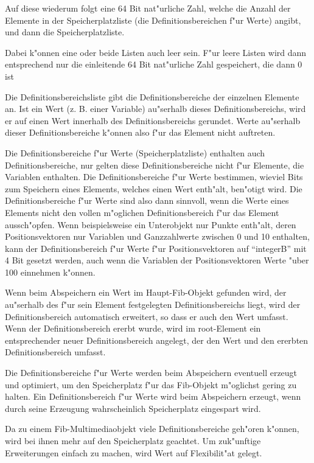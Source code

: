 Auf diese wiederum folgt eine 64 Bit nat"urliche Zahl, welche die Anzahl der Elemente in der Speicherplatzliste (die Definitionsbereichen f"ur Werte) angibt, und dann die Speicherplatzliste.

Dabei k"onnen eine oder beide Listen auch leer sein. F"ur leere Listen wird dann entsprechend nur die einleitende 64 Bit nat"urliche Zahl gespeichert, die dann 0 ist

Die Definitionsbereichsliste gibt die Definitionsbereiche der einzelnen Elemente an. Ist ein Wert (z. B. einer Variable) au"serhalb dieses Definitionsbereichs, wird er auf einen Wert innerhalb des Definitionsbereichs gerundet. Werte au"serhalb dieser Definitionsbereiche k"onnen also f"ur das Element nicht auftreten.

Die Definitionsbereiche f"ur Werte (Speicherplatzliste) enthalten auch Definitionsbereiche, nur gelten diese Definitionsbereiche nicht f"ur Elemente, die Variablen enthalten. Die Definitionsbereiche f"ur Werte bestimmen, wieviel Bits zum Speichern eines Elements, welches einen Wert enth"alt, ben"otigt wird.
Die Definitionsbereiche f"ur Werte sind also dann sinnvoll, wenn die Werte eines Elements nicht den vollen m"oglichen Definitionsbereich f"ur das Element aussch"opfen. Wenn beispielsweise ein Unterobjekt nur Punkte enth"alt, deren Positionsvektoren nur Variablen und Ganzzahlwerte zwischen 0 und 10 enthalten, kann der Definitionsbereich f"ur Werte f"ur Positionsvektoren auf ``integerB'' mit 4 Bit gesetzt werden, auch wenn die Variablen der Positionsvektoren Werte "uber 100 einnehmen k"onnen.

Wenn beim Abspeichern ein Wert im Haupt-Fib-Objekt gefunden wird, der au"serhalb des f"ur sein Element festgelegten Definitionsbereichs liegt, wird der Definitionsbereich automatisch erweitert, so dass er auch den Wert umfasst. Wenn der Definitionsbereich ererbt wurde, wird im root-Element ein entsprechender neuer Definitionsbereich angelegt, der den Wert und den ererbten Definitionsbereich umfasst.

Die Definitionsbereiche f"ur Werte werden beim Abspeichern eventuell erzeugt und optimiert, um den Speicherplatz f"ur das Fib-Objekt m"oglichst gering zu halten. Ein Definitionsbereich f"ur Werte wird beim Abspeichern erzeugt, wenn durch seine Erzeugung wahrscheinlich Speicherplatz eingespart wird.

Da zu einem Fib-Multimediaobjekt viele Definitionsbereiche geh"oren k"onnen, wird bei ihnen mehr auf den Speicherplatz geachtet. Um zuk"unftige Erweiterungen einfach zu machen, wird Wert auf Flexibilit"at gelegt.

